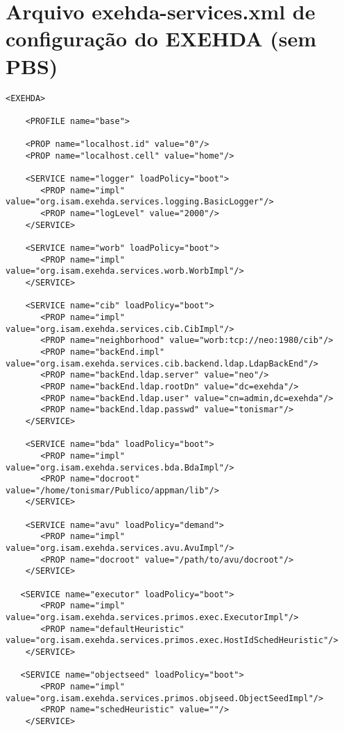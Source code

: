 \appendix
{}
\chapter{Arquivo exehda-services.xml de configuração do EXEHDA (sem PBS)}
\label{anexo:exehda-services}

\begin{scriptsize}
\begin{verbatim}
<EXEHDA>

    <PROFILE name="base">

    <PROP name="localhost.id" value="0"/>
    <PROP name="localhost.cell" value="home"/>

    <SERVICE name="logger" loadPolicy="boot">
       <PROP name="impl" value="org.isam.exehda.services.logging.BasicLogger"/>
       <PROP name="logLevel" value="2000"/>
    </SERVICE>

    <SERVICE name="worb" loadPolicy="boot">
       <PROP name="impl" value="org.isam.exehda.services.worb.WorbImpl"/>
    </SERVICE>

    <SERVICE name="cib" loadPolicy="boot">
       <PROP name="impl" value="org.isam.exehda.services.cib.CibImpl"/>
       <PROP name="neighborhood" value="worb:tcp://neo:1980/cib"/>
       <PROP name="backEnd.impl" value="org.isam.exehda.services.cib.backend.ldap.LdapBackEnd"/>
       <PROP name="backEnd.ldap.server" value="neo"/>
       <PROP name="backEnd.ldap.rootDn" value="dc=exehda"/>
       <PROP name="backEnd.ldap.user" value="cn=admin,dc=exehda"/>
       <PROP name="backEnd.ldap.passwd" value="tonismar"/>
    </SERVICE>

    <SERVICE name="bda" loadPolicy="boot">
       <PROP name="impl" value="org.isam.exehda.services.bda.BdaImpl"/>
       <PROP name="docroot" value="/home/tonismar/Publico/appman/lib"/>
    </SERVICE>

    <SERVICE name="avu" loadPolicy="demand">
       <PROP name="impl" value="org.isam.exehda.services.avu.AvuImpl"/>
       <PROP name="docroot" value="/path/to/avu/docroot"/>
    </SERVICE>

   <SERVICE name="executor" loadPolicy="boot">
       <PROP name="impl" value="org.isam.exehda.services.primos.exec.ExecutorImpl"/>
       <PROP name="defaultHeuristic" value="org.isam.exehda.services.primos.exec.HostIdSchedHeuristic"/>
    </SERVICE>

   <SERVICE name="objectseed" loadPolicy="boot">
       <PROP name="impl" value="org.isam.exehda.services.primos.objseed.ObjectSeedImpl"/>
       <PROP name="schedHeuristic" value=""/>
    </SERVICE>


\end{verbatim}
\end{scriptsize}
